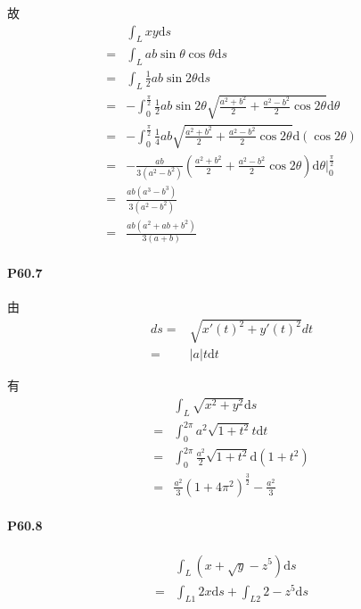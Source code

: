 \documentclass[UTF8]{ctexart}
\begin{document}
    故
    \begin{align*}
        &\int_{L}^{} xy \mathrm{d}s \\
        =& \int_{L}^{} ab \sin \theta \cos \theta \mathrm{d}s \\
        =& \int_{L}^{} \frac{1}{2} ab \sin 2\theta \mathrm{d}s \\
        =&-\int_{0}^{\frac{\pi}{2} } \frac{1}{2} ab \sin 2\theta
        \sqrt{\frac{a^2+b^2}{2} + \frac{a^2-b^2}{2} \cos 2\theta} \mathrm{d}\theta \\
        =&-\int_{0}^{\frac{\pi}{2} }
        \frac{1}{4} ab 
        \sqrt{\frac{a^2+b^2}{2} + \frac{a^2-b^2}{2} \cos 2\theta} 
        \mathrm{d}(\cos 2\theta) \\
        =& -\frac{ab}{3(a^2 - b ^2)} \left(\frac{a^2+b^2}{2} + \frac{a^2-b^2}{2} \cos 2\theta \right) \mathrm{d}\theta 
        \big|_{0}^{\frac{\pi}{2} } \\
        =& \frac{ab(a^3-b^3)}{3(a^2-b^2)} \\
        =& \frac{ab(a^2+ab+b^2)}{3(a+b)} 
    \end{align*}

    \paragraph*{P60.7}

    由
    \begin{align*}
        ds =& \sqrt{x'(t)^2 + y'(t)^2} dt \\
        =& |a|t \mathrm{d}t  
    \end{align*}

    有
    \begin{align*}
        &\int_{L} \sqrt{x^2+y^2} \mathrm{d}s \\
        =& \int_{0}^{2\pi} a^2\sqrt{1+t^2}t \mathrm{d}t \\
        =& \int_{0}^{2\pi} \frac{a^2}{2} \sqrt{1+t^2} \mathrm{d}(1+t^2) \\
        =& \frac{a^2}{3} (1+4\pi^2)^{\frac{3}{2} } - \frac{a^2}{3} 
    \end{align*}
    \paragraph*{P60.8}
    \begin{align*}
        &\int_{L} (x+\sqrt{y} -z^5)\mathrm{d}s \\
        =& \int_{L1}^{} 2x \mathrm{d}s + \int_{L2}^{} 2-z^5 \mathrm{d}s \\
    \end{align*}
\end{document}
